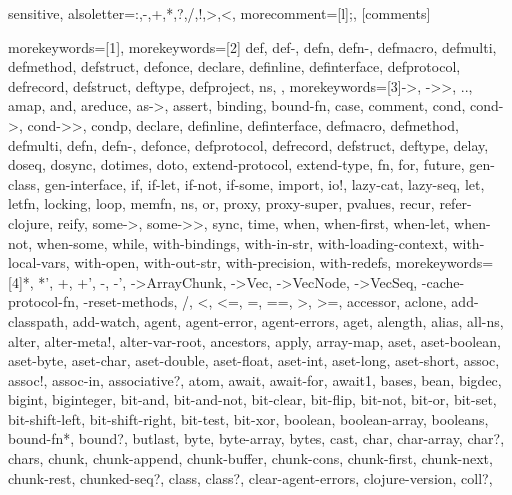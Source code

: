 \usepackage{listings}
\usepackage{color}
\usepackage{xcolor}

{sensitive, %
 alsoletter={:,-,+,*,?,/,!,>,<}, %
 morecomment=[l];, %
}[comments]

%
{%
 morekeywords=[1]{},
 morekeywords=[2]{%
   def, def-, defn, defn-, defmacro, defmulti, defmethod, %
   defstruct, defonce, declare, definline, definterface, %
   defprotocol, defrecord, defstruct, deftype, defproject, ns, %
 }, %
 morekeywords=[3]{->, ->>, .., amap, and, areduce, as->, assert, binding, %
   bound-fn, case, comment, cond, cond->, cond->>, condp, declare, definline, %
   definterface, defmacro, defmethod, defmulti, defn, defn-, defonce, %
   defprotocol, defrecord, defstruct, deftype, delay, doseq, dosync, dotimes, %
   doto, extend-protocol, extend-type, fn, for, future, gen-class, %
   gen-interface, if, if-let, if-not, if-some, import, io!, lazy-cat, lazy-seq, let, %
   letfn, locking, loop, memfn, ns, or, proxy, proxy-super, pvalues, %
   recur, refer-clojure, reify, some->, some->>, sync, time, when, when-first, %
   when-let, when-not, when-some, while, with-bindings, with-in-str, %
   with-loading-context, with-local-vars, with-open, with-out-str, %
   with-precision, with-redefs}, %
  morekeywords=[4]{*, *', +, +', -, -', ->ArrayChunk, ->Vec, ->VecNode, %
    ->VecSeq, -cache-protocol-fn, -reset-methods, /, <, <=, =, ==, >, >=, %
    accessor, aclone, add-classpath, add-watch, agent, agent-error, %
    agent-errors, aget, alength, alias, all-ns, alter, alter-meta!, %
    alter-var-root, ancestors, apply, array-map, aset, aset-boolean, aset-byte, %
    aset-char, aset-double, aset-float, aset-int, aset-long, aset-short, assoc, %
    assoc!, assoc-in, associative?, atom, await, await-for, await1, bases, bean, %
    bigdec, bigint, biginteger, bit-and, bit-and-not, bit-clear, bit-flip, %
    bit-not, bit-or, bit-set, bit-shift-left, bit-shift-right, bit-test, %
    bit-xor, boolean, boolean-array, booleans, bound-fn*, bound?, butlast, byte, %
    byte-array, bytes, cast, char, char-array, char?, chars, chunk, %
    chunk-append, chunk-buffer, chunk-cons, chunk-first, chunk-next, chunk-rest, %
    chunked-seq?, class, class?, clear-agent-errors, clojure-version, coll?, %
}}
